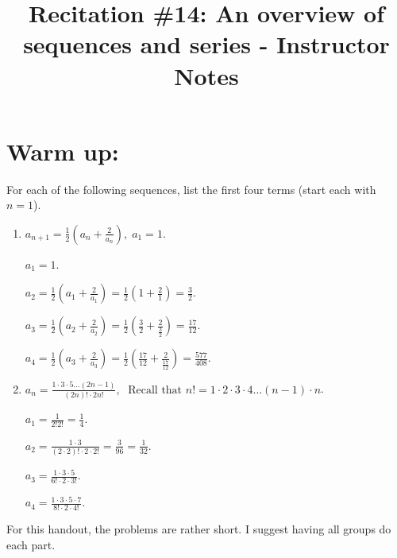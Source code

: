 \documentclass[handout,instructornotes]{ximera}
\title{Recitation \#14: An overview of sequences and series - Instructor Notes}
\begin{document}
\begin{abstract}		\end{abstract}
\maketitle




\section{Warm up:}

	For each of the following sequences, list the first four terms (start each with $n=1$).
	\begin{enumerate}
	\item 	$a_{n+1} = \frac{1}{2} \left( a_n + \frac{2}{a_n} \right), \; a_1 = 1$.
	\begin{freeResponse}
	  \; $a_1 = 1$.
	
	  \; $a_2 = \frac{1}{2} \left( a_1 + \frac{2}{a_1} \right) = \frac{1}{2} \left( 1 + \frac{2}{1} \right) = \frac{3}{2}$.
	
	  \; $a_3 = \frac{1}{2} \left( a_2 + \frac{2}{a_2} \right) = \frac{1}{2} \left( \frac{3}{2} + \frac{2}{\frac{3}{2}} \right) = \frac{17}{12}$.
	
	  \; $a_4 = \frac{1}{2} \left( a_3 + \frac{2}{a_3} \right) = \frac{1}{2} \left( \frac{17}{12} + \frac{2}{\frac{17}{12}} \right) = \frac{577}{408}.$
	\end{freeResponse}
	
	
	
	\item 	$a_n = \frac{1 \cdot 3 \cdot 5 \hdots (2n-1)}{(2n)! \cdot 2n!}, \; \text{ Recall that }n! = 1 \cdot 2 \cdot 3 \cdot 4 \hdots (n-1) \cdot n$.
	\begin{freeResponse}
	  \; $a_1 = \frac{1}{2! 2!} = \frac{1}{4}$.
	
	  \; $a_2 = \frac{1 \cdot 3}{(2 \cdot 2)! \cdot 2 \cdot 2!} = \frac{3}{96} = \frac{1}{32}$.
	
	  \; $a_3 = \frac{1 \cdot 3 \cdot 5}{6! \cdot 2 \cdot 3!}$.
	
	  \; $a_4 = \frac{1 \cdot 3 \cdot 5 \cdot 7}{8! \cdot 2 \cdot 4!}$.
	\end{freeResponse}
	\end{enumerate}
	
\begin{instructorNotes}
For this handout, the problems are rather short. I suggest having all groups do each part.
\end{instructorNotes}
\end{document}

